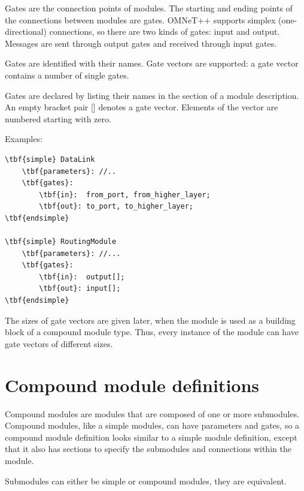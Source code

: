 
Gates are the connection points of modules. The starting and 
ending points of the connections between modules are gates. OMNeT++ 
supports simplex (one-directional) connections, so there are 
two kinds of gates: input and output. Messages are sent through 
output gates and received through input gates. 

Gates are identified with their names. Gate vectors are supported: 
a gate vector contains a number of single gates.

Gates are declared by listing their names in the
 section of a module description. An
empty bracket pair [] denotes a gate vector.
Elements of the vector are numbered starting with zero.

Examples:

\begin{Verbatim}[commandchars=\\\{\}]
\tbf{simple} DataLink
    \tbf{parameters}: //..
    \tbf{gates}:
        \tbf{in}:  from_port, from_higher_layer;
        \tbf{out}: to_port, to_higher_layer;
\tbf{endsimple}

\tbf{simple} RoutingModule
    \tbf{parameters}: //...
    \tbf{gates}:
        \tbf{in}:  output[];
        \tbf{out}: input[];
\tbf{endsimple}
\end{Verbatim}

The sizes of gate vectors are given later, when the module is used as
a building block of a compound module type. Thus, every instance of
the module can have gate vectors of different sizes.





\section{Compound module definitions}


Compound modules are modules that are composed of one or more
submodules. Compound modules, like a
simple modules, can have parameters and
gates, so a compound module
definition looks similar to a
simple module definition, except that it also has
sections to specify the submodules and connections within the module.


Submodules can either be simple or
compound modules, they are equivalent.


